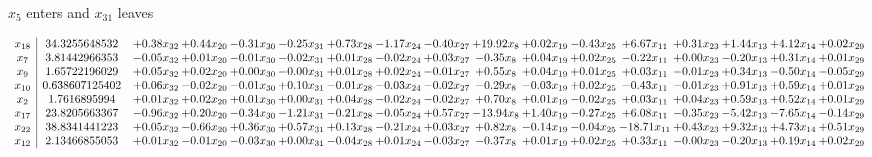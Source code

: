 \documentclass[9pt]{article}
\begin{document}
 $ x_{5} $ enters and $ x_{31} $ leaves 

 \[\begin{array}{c| c c@{\hskip 2pt} c@{\hskip 2pt} c@{\hskip 2pt} c@{\hskip 2pt} c@{\hskip 2pt} c@{\hskip 2pt} c@{\hskip 2pt} c@{\hskip 2pt} c@{\hskip 2pt} c@{\hskip 2pt} c@{\hskip 2pt} c@{\hskip 2pt} c@{\hskip 2pt} c@{\hskip 2pt} c@{\hskip 2pt} }
 x_{18}   &  34.3255648532 & +  0.38 x_{32} & +  0.44 x_{20} & -0.31 x_{30} & -0.25 x_{31} & +  0.73 x_{28} & -1.17 x_{24} & -0.40 x_{27} & + 19.92 x_{8} & +  0.02 x_{19} & -0.43 x_{25} & +  6.67 x_{11} & +  0.31 x_{23} & +  1.44 x_{13} & +  4.12 x_{14} & +  0.02 x_{29}\\
 x_{7}   &  3.81442966353 & -0.05 x_{32} & +  0.01 x_{20} & -0.01 x_{30} & -0.02 x_{31} & +  0.01 x_{28} & -0.02 x_{24} & +  0.03 x_{27} & -0.35 x_{8} & +  0.04 x_{19} & +  0.02 x_{25} & -0.22 x_{11} & +  0.00 x_{23} & -0.20 x_{13} & +  0.31 x_{14} & +  0.01 x_{29}\\
 x_{9}   &  1.65722196029 & +  0.05 x_{32} & +  0.02 x_{20} & +  0.00 x_{30} & -0.00 x_{31} & +  0.01 x_{28} & +  0.02 x_{24} & -0.01 x_{27} & +  0.55 x_{8} & +  0.04 x_{19} & +  0.01 x_{25} & +  0.03 x_{11} & -0.01 x_{23} & +  0.34 x_{13} & -0.50 x_{14} & -0.05 x_{29}\\
 x_{10}   &  0.638607125402 & +  0.06 x_{32} & -0.02 x_{20} & -0.01 x_{30} & +  0.10 x_{31} & -0.01 x_{28} & -0.03 x_{24} & -0.02 x_{27} & -0.29 x_{8} & -0.03 x_{19} & +  0.02 x_{25} & -0.43 x_{11} & -0.01 x_{23} & +  0.91 x_{13} & +  0.59 x_{14} & +  0.01 x_{29}\\
 x_{2}   &  1.7616895994 & +  0.01 x_{32} & +  0.02 x_{20} & +  0.01 x_{30} & +  0.00 x_{31} & +  0.04 x_{28} & -0.02 x_{24} & -0.02 x_{27} & +  0.70 x_{8} & +  0.01 x_{19} & -0.02 x_{25} & +  0.03 x_{11} & +  0.04 x_{23} & +  0.59 x_{13} & +  0.52 x_{14} & +  0.01 x_{29}\\
 x_{17}   &  23.8205663367 & -0.96 x_{32} & +  0.20 x_{20} & -0.34 x_{30} & -1.21 x_{31} & -0.21 x_{28} & -0.05 x_{24} & +  0.57 x_{27} & -13.94 x_{8} & +  1.40 x_{19} & -0.27 x_{25} & +  6.08 x_{11} & -0.35 x_{23} & -5.42 x_{13} & -7.65 x_{14} & -0.14 x_{29}\\
 x_{22}   &  38.8341441223 & +  0.05 x_{32} & -0.66 x_{20} & +  0.36 x_{30} & +  0.57 x_{31} & +  0.13 x_{28} & -0.21 x_{24} & +  0.03 x_{27} & +  0.82 x_{8} & -0.14 x_{19} & -0.04 x_{25} & -18.71 x_{11} & +  0.43 x_{23} & +  9.32 x_{13} & +  4.73 x_{14} & +  0.51 x_{29}\\
 x_{12}   &  2.13466855053 & +  0.01 x_{32} & -0.01 x_{20} & -0.03 x_{30} & +  0.00 x_{31} & -0.04 x_{28} & +  0.01 x_{24} & -0.03 x_{27} & -0.37 x_{8} & +  0.01 x_{19} & +  0.02 x_{25} & +  0.33 x_{11} & -0.00 x_{23} & -0.20 x_{13} & +  0.19 x_{14} & +  0.02 x_{29}\\

\end{array}\]
\end{document}
